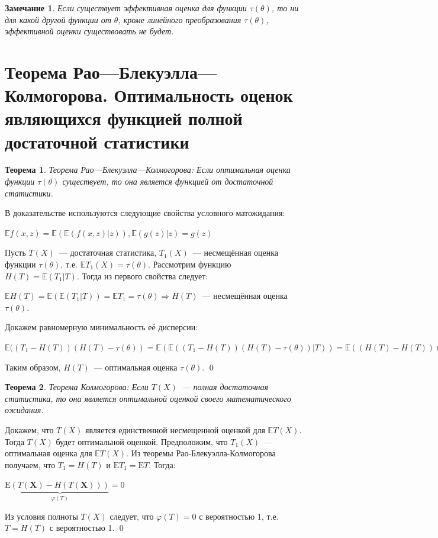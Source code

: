 \documentclass[oneside,final,14pt]{extreport}
\renewenvironment{proof}{{\bfseries Доказательство.}}{\qed}
\newtheorem{thm}{Теорема}[section]
\newtheorem*{rmrk}{Замечание}
\theoremstyle{definition}
\begin{document}
\begin{rmrk}
Если существует эффективная оценка для функции \(\tau(\theta)\), то ни для какой другой функции от \(\theta\), кроме линейного преобразования \(\tau(\theta)\), эффективной оценки существовать не будет. 
\end{rmrk}

\section{Теорема Рао—Блекуэлла—Колмогорова. Оптимальность оценок являющихся функцией полной достаточной статистики}

\begin{thm}
{\it Теорема Рао—Блекуэлла—Колмогорова:} Если оптимальная оценка функции \(\tau(\theta)\) существует, то она является функцией от достаточной статистики.
\end{thm}

\begin{proof}
В доказательстве используются следующие свойства условного матожидания: 

\( \mathbb{E} f(x, z)=\mathbb{E}(\mathbb{E}(f(x, z) | z)),
\mathbb{E}(g(z) | z)=g(z)\)

Пусть \(T(X)\)~--- достаточная статистика, \(T_1(X)\)~--- несмещённая оценка функции \(\tau(\theta)\), т.е. \(\mathbb{E} T_{1}(X)=\tau(\theta)\). Рассмотрим функцию \( H(T)=\mathbb{E}\left(T_{1} | T\right) \). Тогда из первого свойства следует:

\( \mathbb{E} H(T)=\mathbb{E}\left(\mathbb{E}\left(T_{1} | T\right)\right)=\mathbb{E} T_{1}=\tau(\theta) \Rightarrow H(T)\)~--- несмещённая оценка \(\tau(\theta)\).

Докажем равномерную минимальность её дисперсии:

\( \mathbb{E}((T_{1}-H(T))(H(T)-\tau(\theta))=\mathbb{E}(\mathbb{E}((T_{1}-H(T))(H(T)-\tau(\theta)) | T)) =\mathbb{E}((H(T)-H(T))(H(T)-\tau(\theta)))=0 \)

Таким образом, \(H(T)\)~--- оптимальная оценка \(\tau(\theta)\).
\end{proof}

\begin{thm}
{\it Теорема Колмогорова:} Если \(T(X)\)~--- полная достаточная статистика, то она является оптимальной оценкой своего математического ожидания.
\end{thm}

\begin{proof}
Докажем, что \(T(X)\) является единственной несмещенной оценкой для \( \mathbb{E}T(X)\). Тогда \(T(X)\) будет оптимальной оценкой. Предположим, что \(T_1(X)\)~--- оптимальная оценка для \( \mathbb{E}T(X)\). Из теоремы Рао-Блекуэлла-Колмогорова получаем, что \( T_{1}=H(T) \) и \( \mathrm{E} T_{1}=\mathrm{E} T \). Тогда:

\( \mathrm{E} \underbrace{(T(\mathbf{X})-H(T(\mathbf{X})))}_{\varphi(T)}=0 \)

Из условия полноты \(T(X)\) следует, что \( \varphi(T)=0 \) с вероятностью 1, т.е. \(T=H(T)\) с вероятностью 1.
\end{proof}
\end{document}
